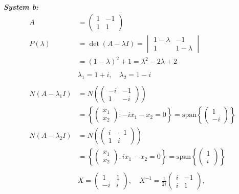 \documentclass{article}
\begin{document}
\vspace{0.2cm}\noindent\textbf{\textit{System b:}}
\begin{align*}
    A &= \begin{pmatrix} 1 & -1 \\ 1 & 1 \end{pmatrix} \\
    P(\lambda) &= \det(A - \lambda I) = \begin{vmatrix} 1 - \lambda & -1 \\ 1 & 1 - \lambda \end{vmatrix} \\
    &= (1 - \lambda)^2 + 1 = \lambda^2 - 2\lambda + 2 \\
    \\
    &\lambda_1 = 1 + i, \quad \lambda_2 = 1 - i \\
    \\
    N(A - \lambda_1 I) &= N\left(\begin{pmatrix} -i & -1 \\ 1 & -i \end{pmatrix}\right) \\
    &= \left\{ \begin{pmatrix} x_1 \\ x_2 \end{pmatrix} : -ix_1 - x_2 = 0 \right\}
    = \text{span}\left\{ \begin{pmatrix} 1 \\ -i \end{pmatrix} \right\} \\
    N(A - \lambda_2 I) &= N\left(\begin{pmatrix} i & -1 \\ 1 & i \end{pmatrix}\right) \\
    &= \left\{ \begin{pmatrix} x_1 \\ x_2 \end{pmatrix} : ix_1 - x_2 = 0 \right\}
    = \text{span}\left\{ \begin{pmatrix} 1 \\ i \end{pmatrix} \right\} \\
    \\
    &X = \begin{pmatrix} 1 & 1 \\ -i & i \end{pmatrix} , \quad
    X^{-1} = \frac{1}{2i} \begin{pmatrix} i & -1 \\ i & 1 \end{pmatrix} , \quad

\end{align*}
\end{document}
